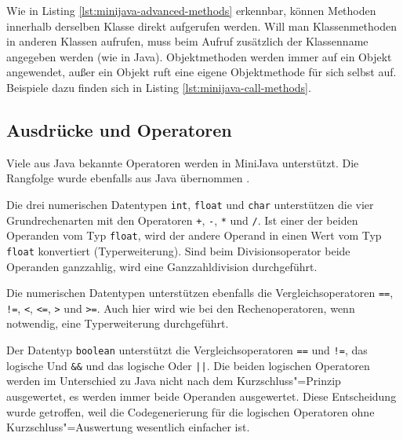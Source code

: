 \pagebreak


Wie in Listing \ref{lst:minijava-advanced-methods} erkennbar, können Methoden innerhalb derselben Klasse direkt aufgerufen werden. Will man Klassenmethoden in anderen Klassen aufrufen, muss beim Aufruf zusätzlich der Klassenname angegeben werden (wie in Java). Objektmethoden werden immer auf ein Objekt angewendet, außer ein Objekt ruft eine eigene Objektmethode für sich selbst auf. Beispiele dazu finden sich in Listing \ref{lst:minijava-call-methods}.



\subsection{Ausdrücke und Operatoren}

Viele aus Java bekannte Operatoren werden in MiniJava unterstützt. Die Rangfolge wurde ebenfalls aus Java übernommen \cite{JavaOperators}.

Die drei numerischen Datentypen \lstinline{int}, \lstinline{float} und \lstinline{char} unterstützen die vier Grundrechenarten mit den Operatoren \lstinline{+}, \lstinline{-}, \lstinline{*} und \lstinline{/}. Ist einer der beiden Operanden vom Typ \lstinline{float}, wird der andere Operand in einen Wert vom Typ \lstinline{float} konvertiert (Typerweiterung). Sind beim Divisionsoperator beide Operanden ganzzahlig, wird eine Ganzzahldivision durchgeführt.

Die numerischen Datentypen unterstützen ebenfalls die Vergleichsoperatoren \lstinline{==}, \lstinline{!=}, \mbox{\lstinline{<},} \lstinline{<=}, \lstinline{>} und \lstinline{>=}. Auch hier wird wie bei den Rechenoperatoren, wenn notwendig, eine Typerweiterung durchgeführt.

Der Datentyp \lstinline{boolean} unterstützt die Vergleichsoperatoren \lstinline{==} und \lstinline{!=}, das logische Und \lstinline{&&} und das logische Oder \lstinline{||}. Die beiden logischen Operatoren werden im Unterschied zu Java nicht nach dem Kurzschluss"=Prinzip ausgewertet, es werden immer beide Operanden ausgewertet. Diese Entscheidung wurde getroffen, weil die Codegenerierung für die logischen Operatoren ohne Kurzschluss"=Auswertung wesentlich einfacher ist.

